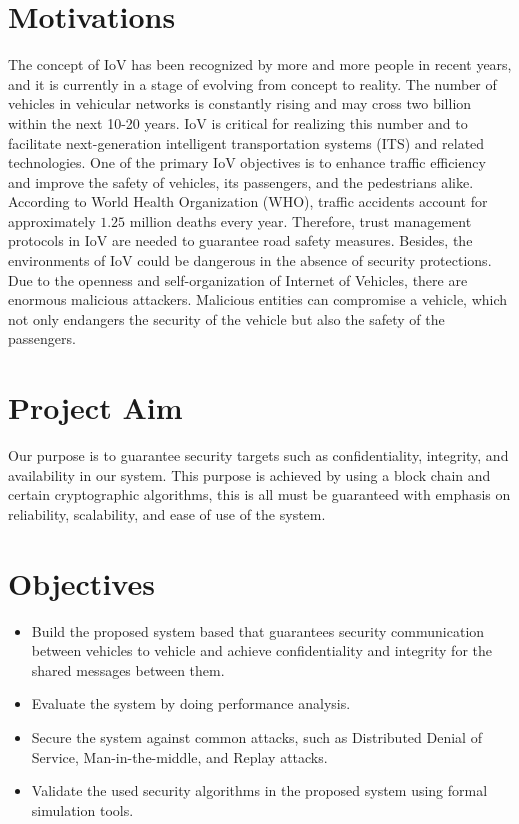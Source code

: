 	\section{Motivations}
		\label{}
		The concept of IoV has been recognized by more and more people in recent years, and it is currently in a stage of evolving from concept to reality. The number of vehicles in vehicular networks is constantly rising and may cross two billion within the next 10-20 years. IoV is critical for realizing this number and to facilitate next-generation intelligent transportation systems (ITS) and related technologies. One of the primary IoV objectives is to enhance traffic efficiency and improve the safety of vehicles, its passengers, and the pedestrians alike. According to World Health Organization (WHO), traffic accidents account for approximately $1.25$ million deaths every year. Therefore, trust management protocols in IoV are needed to guarantee road safety measures. Besides, the environments of IoV could be dangerous in the absence of security protections. Due to the openness and self-organization of Internet of Vehicles, there are enormous malicious attackers. Malicious entities can compromise a vehicle, which not only endangers the security of the vehicle but also the safety of the passengers. 
	
	\section{Project Aim}
		\label{}
		Our purpose is to guarantee security targets such as confidentiality, integrity, and availability in our system. This purpose is achieved by using a block chain and certain cryptographic algorithms, this is all must be guaranteed with emphasis on reliability, scalability, and ease of use of the system. 
	
	\section{Objectives}
		\label{}
		\begin{itemize}
			\item Build the proposed system based that guarantees security communication between vehicles to vehicle and achieve confidentiality and integrity for the shared messages between them. 
			\item Evaluate the system by doing performance analysis. 
			\item Secure the system against common attacks, such as Distributed Denial of Service, Man-in-the-middle, and Replay attacks. 
			\item Validate the used security algorithms in the proposed system using formal simulation tools. 
		\end{itemize}
	
